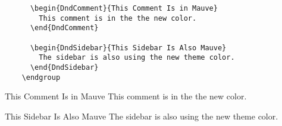 \documentclass[letterpaper,openany,nodeprecatedcode]{dndbook}
\begin{document}
\begin{multicols}{2}
\begin{lstlisting}
      \begin{DndComment}{This Comment Is in Mauve}
        This comment is in the the new color.
      \end{DndComment}

      \begin{DndSidebar}{This Sidebar Is Also Mauve}
        The sidebar is also using the new theme color.
      \end{DndSidebar}
    \endgroup
  \end{lstlisting}

  \begingroup
    \DndSetThemeColor[PhbMauve]

    \begin{DndComment}{This Comment Is in Mauve}
      This comment is in the the new color.
    \end{DndComment}

    \begin{DndSidebar}{This Sidebar Is Also Mauve}
      The sidebar is also using the new theme color.
    \end{DndSidebar}
  \endgroup

  \end{multicols}
\end{document}
